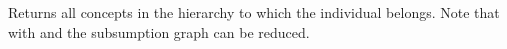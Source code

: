  

Returns all concepts in the hierarchy to which the individual belongs.
Note that with  and  the
subsumption graph can be reduced.


